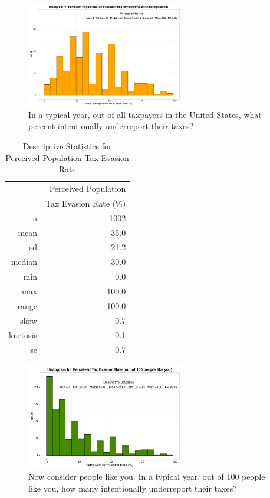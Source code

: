 \documentclass{NSF_proposal_mod}
\begin{document}
\begin{figure}[h!]
\centering
\includegraphics[width = 0.61\textwidth]{HistPerceivedEvasionRatePopulation.pdf}
\caption{In a typical year, out of all taxpayers in the United States, what percent intentionally underreport their taxes?}
\label{Fig3}
\end{figure}


\begin{table}[ht]
\centering
\begin{tabular}{rr}
  \hline
 & Perceived Population\\
 &Tax Evasion Rate (\%) \\ 
  \hline
  n & 1002 \\ 
  mean & 35.0 \\ 
  sd & 21.2 \\ 
  median & 30.0 \\ 
  min & 0.0 \\ 
  max & 100.0 \\ 
  range & 100.0 \\ 
  skew & 0.7 \\ 
  kurtosis & -0.1 \\ 
  se & 0.7 \\ 
   \hline
\end{tabular}
\caption{Descriptive Statistics for Perceived Population Tax Evasion Rate} 
\end{table}


\begin{figure}[h!]
\centering
\includegraphics[width = 0.61\textwidth]{HistPerceivedEvasionRate.pdf}
\caption{Now consider people like you. In a typical year, out of 100 people like you, how many intentionally underreport their taxes?}
\label{Fig4}
\end{figure}
\end{document}

